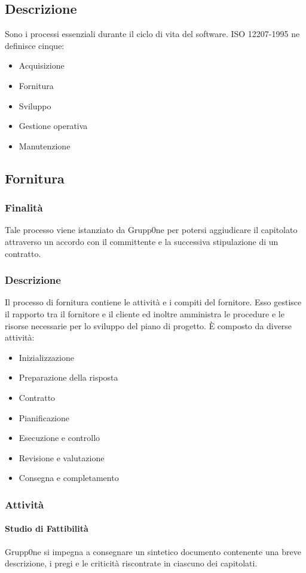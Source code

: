 \documentclass[../norme-di-progetto.tex]{subfiles}
\begin{document}
\subsection{Descrizione}
\label{sub:descrizione}
Sono i processi essenziali durante il ciclo di vita del software. ISO 12207-1995 ne definisce cinque:
\begin{itemize}
	\item Acquisizione
	\item Fornitura
	\item Sviluppo
	\item Gestione operativa
	\item Manutenzione
\end{itemize}
\subsection{Fornitura}
\label{sub:fornitura}
\subsubsection{Finalità}
\label{subs:finalità}
Tale processo viene istanziato da Grupp0ne per potersi aggiudicare il capitolato attraverso un accordo con il committente e la successiva stipulazione di un contratto.
\subsubsection{Descrizione}
\label{subs:descrizione}
Il processo di fornitura contiene le attività e i compiti del fornitore. Esso gestisce il rapporto tra il fornitore e il cliente ed inoltre amministra le procedure e le risorse necessarie per lo sviluppo del piano di progetto. È composto da diverse attività:
\begin{itemize}
\item Inizializzazione
\item Preparazione della risposta
\item Contratto
\item Pianificazione
\item Esecuzione e controllo
\item Revisione e valutazione
\item Consegna e completamento
\end{itemize}
\subsubsection{Attività}
\label{subs:attività}
\paragraph{Studio di Fattibilità}
\label{par:studio di fattibilità}
Grupp0ne si impegna a consegnare un sintetico documento contenente una breve descrizione, i pregi e le criticità riscontrate in ciascuno dei capitolati.
\end{document}

